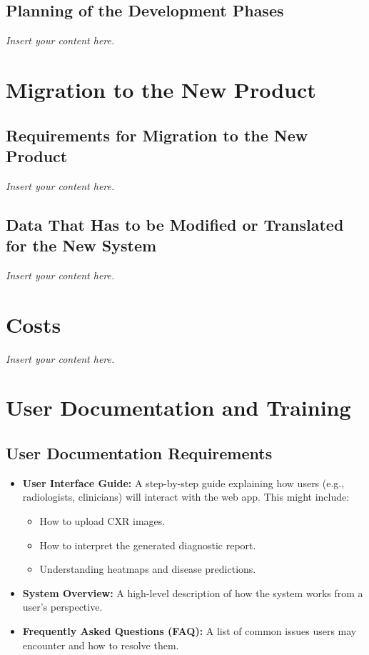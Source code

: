 \documentclass[12pt]{article}
\newcommand{\lips}{\textit{Insert your content here.}}
\begin{document}
\subsection{Planning of the Development Phases}
\lips

\section{Migration to the New Product}
\subsection{Requirements for Migration to the New Product}
\lips
\subsection{Data That Has to be Modified or Translated for the New System}
\lips

\section{Costs}
\lips
\section{User Documentation and Training}
\subsection{User Documentation Requirements}
\begin{itemize}
    \item \textbf{User Interface Guide:} A step-by-step guide explaining how users (e.g., radiologists, clinicians) will interact with the web app. This might include:
    \begin{itemize}
        \item How to upload CXR images.
        \item How to interpret the generated diagnostic report.
        \item Understanding heatmaps and disease predictions.
    \end{itemize}
    \item \textbf{System Overview:} A high-level description of how the system works from a user’s perspective.
    \item \textbf{Frequently Asked Questions (FAQ):} A list of common issues users may encounter and how to resolve them.
\end{itemize}
\end{document}
